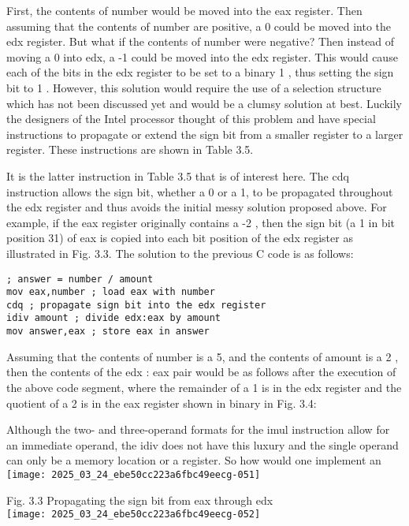 \documentclass[10pt]{article}
\begin{document}
First, the contents of number would be moved into the eax register. Then assuming that the contents of number are positive, a 0 could be moved into the edx register. But what if the contents of number were negative? Then instead of moving a 0 into edx, a -1 could be moved into the edx register. This would cause each of the bits in the edx register to be set to a binary 1 , thus setting the sign bit to 1 . However, this solution would require the use of a selection structure which has not been discussed yet and would be a clumsy solution at best. Luckily the designers of the Intel processor thought of this problem and have special instructions to propagate or extend the sign bit from a smaller register to a larger register. These instructions are shown in Table 3.5.

It is the latter instruction in Table 3.5 that is of interest here. The cdq instruction allows the sign bit, whether a 0 or a 1, to be propagated throughout the edx register and thus avoids the initial messy solution proposed above. For example, if the eax register originally contains a -2 , then the sign bit (a 1 in bit position 31) of eax is copied into each bit position of the edx register as illustrated in Fig. 3.3. The solution to the previous C code is as follows:

\begin{verbatim}
; answer = number / amount
mov eax,number ; load eax with number
cdq ; propagate sign bit into the edx register
idiv amount ; divide edx:eax by amount
mov answer,eax ; store eax in answer
\end{verbatim}

Assuming that the contents of number is a 5, and the contents of amount is a 2 , then the contents of the edx : eax pair would be as follows after the execution of the above code segment, where the remainder of a 1 is in the edx register and the quotient of a 2 is in the eax register shown in binary in Fig. 3.4:

Although the two- and three-operand formats for the imul instruction allow for an immediate operand, the idiv does not have this luxury and the single operand can only be a memory location or a register. So how would one implement an\\
\texttt{[image: 2025\_03\_24\_ebe50cc223a6fbc49eecg-051]}

Fig. 3.3 Propagating the sign bit from eax through edx\\
\texttt{[image: 2025\_03\_24\_ebe50cc223a6fbc49eecg-052]}
\end{document}
